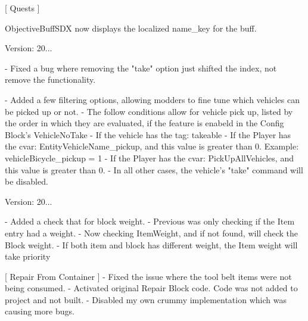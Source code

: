 \mbox{[} Quests \mbox{]}
\begin{DoxyItemize}
\item Objective\+Buff\+SDX now displays the localized name\+\_\+key for the buff.
\end{DoxyItemize}

Version\+: 20... \begin{DoxyVerb}
    - Fixed a bug where removing the "take" option just shifted the index, not remove the functionality.

    - Added a few filtering options, allowing modders to fine tune which vehicles can be picked up or not. 
    - The follow conditions allow for vehicle pick up, listed by the order in which they are evaluated, if the feature is enabeld in the Config Block's VehicleNoTake
        - If the vehicle has the tag: takeable
        - If the Player has the cvar: {EntityVehicleName}_pickup, and this value is greater than 0.  
            Example:     vehicleBicycle_pickup = 1
        - If the Player has the cvar: PickUpAllVehicles, and this value is greater than 0.
    - In all other cases, the vehicle's "take" command will be disabled.
\end{DoxyVerb}


Version\+: 20... \begin{DoxyVerb}[ Encumbrance ]
    - Added a check that for block weight.
        - Previous was only checking if the Item entry had a weight.
        - Now checking ItemWeight, and if not found, will check the Block weight.
        - If both item and block has different weight, the Item weight will take priority

[ Repair From Container ]
    - Fixed the issue where the tool belt items were not being consumed.
    - Activated original Repair Block code. Code was not added to project and not built.
        - Disabled my own crummy implementation which was causing more bugs.
\end{DoxyVerb}


